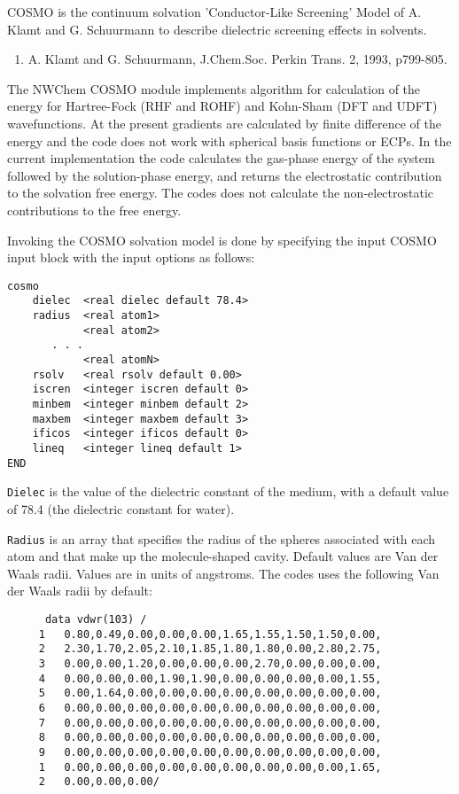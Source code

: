 \label{sec:cosmo}

COSMO is the continuum solvation 'Conductor-Like Screening' Model 
of A. Klamt and G. Schuurmann to describe dielectric screening
effects in solvents.

\begin{enumerate}
\item A. Klamt and G. Schuurmann, J.Chem.Soc. Perkin Trans. 2, 1993,
p799-805.
\end{enumerate}

The NWChem COSMO module implements algorithm for calculation of the
energy for Hartree-Fock (RHF and ROHF) and Kohn-Sham (DFT and UDFT)
wavefunctions. At the present gradients are calculated by finite
difference of the energy and the code does not work with spherical
basis functions or ECPs.  In the current implementation the code
calculates the gas-phase energy of the system followed by the
solution-phase energy, and returns the electrostatic contribution
to the solvation free energy. The codes does not calculate the
non-electrostatic contributions to the free energy.

Invoking the COSMO solvation model is done by specifying the input
COSMO input block with the input options as follows:

\begin{verbatim}
cosmo
    dielec  <real dielec default 78.4>
    radius  <real atom1>
            <real atom2>
       . . .
            <real atomN>
    rsolv   <real rsolv default 0.00>
    iscren  <integer iscren default 0>
    minbem  <integer minbem default 2>
    maxbem  <integer maxbem default 3>
    ificos  <integer ificos default 0>
    lineq   <integer lineq default 1>
END
\end{verbatim}

\verb+Dielec+ is the value of the dielectric constant of the medium, 
with a default value of 78.4 (the dielectric constant for water).

\verb+Radius+ is an array that specifies the radius of the spheres
associated with each atom and that make up the molecule-shaped cavity.
Default values are Van der Waals radii. Values are in units of angstroms.
The codes uses the following Van der Waals radii by default:

\begin{verbatim}
      data vdwr(103) /
     1   0.80,0.49,0.00,0.00,0.00,1.65,1.55,1.50,1.50,0.00,
     2   2.30,1.70,2.05,2.10,1.85,1.80,1.80,0.00,2.80,2.75,
     3   0.00,0.00,1.20,0.00,0.00,0.00,2.70,0.00,0.00,0.00,
     4   0.00,0.00,0.00,1.90,1.90,0.00,0.00,0.00,0.00,1.55,
     5   0.00,1.64,0.00,0.00,0.00,0.00,0.00,0.00,0.00,0.00,
     6   0.00,0.00,0.00,0.00,0.00,0.00,0.00,0.00,0.00,0.00,
     7   0.00,0.00,0.00,0.00,0.00,0.00,0.00,0.00,0.00,0.00,
     8   0.00,0.00,0.00,0.00,0.00,0.00,0.00,0.00,0.00,0.00,
     9   0.00,0.00,0.00,0.00,0.00,0.00,0.00,0.00,0.00,0.00,
     1   0.00,0.00,0.00,0.00,0.00,0.00,0.00,0.00,0.00,1.65,
     2   0.00,0.00,0.00/
\end{verbatim}


